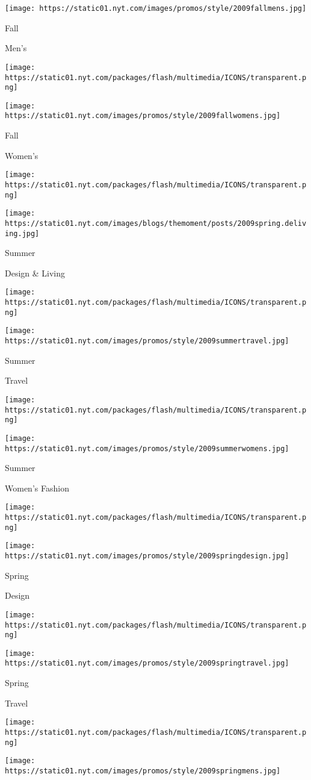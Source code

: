 \texttt{[image: https://static01.nyt.com/images/promos/style/2009fallmens.jpg]}

Fall

Men's

\texttt{[image: https://static01.nyt.com/packages/flash/multimedia/ICONS/transparent.png]}

\texttt{[image: https://static01.nyt.com/images/promos/style/2009fallwomens.jpg]}

Fall

Women's

\texttt{[image: https://static01.nyt.com/packages/flash/multimedia/ICONS/transparent.png]}

\texttt{[image: https://static01.nyt.com/images/blogs/themoment/posts/2009spring.deliving.jpg]}

Summer

Design \& Living

\texttt{[image: https://static01.nyt.com/packages/flash/multimedia/ICONS/transparent.png]}

\texttt{[image: https://static01.nyt.com/images/promos/style/2009summertravel.jpg]}

Summer

Travel

\texttt{[image: https://static01.nyt.com/packages/flash/multimedia/ICONS/transparent.png]}

\texttt{[image: https://static01.nyt.com/images/promos/style/2009summerwomens.jpg]}

Summer

Women's Fashion

\texttt{[image: https://static01.nyt.com/packages/flash/multimedia/ICONS/transparent.png]}

\texttt{[image: https://static01.nyt.com/images/promos/style/2009springdesign.jpg]}

Spring

Design

\texttt{[image: https://static01.nyt.com/packages/flash/multimedia/ICONS/transparent.png]}

\texttt{[image: https://static01.nyt.com/images/promos/style/2009springtravel.jpg]}

Spring

Travel

\texttt{[image: https://static01.nyt.com/packages/flash/multimedia/ICONS/transparent.png]}

\texttt{[image: https://static01.nyt.com/images/promos/style/2009springmens.jpg]}


